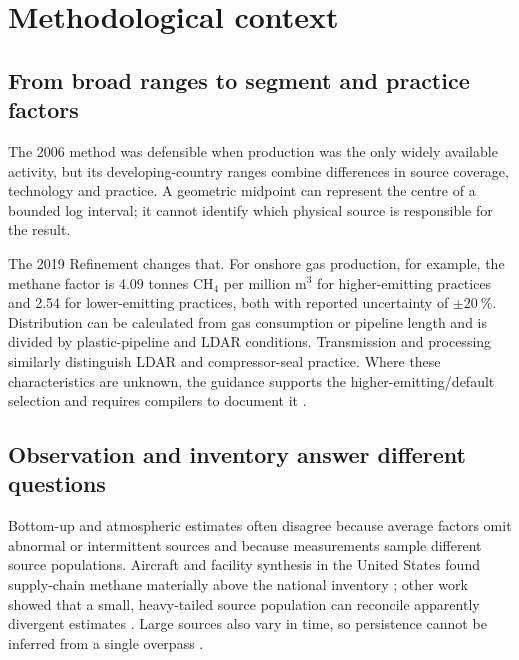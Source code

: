 \section{Methodological context}
\label{sec:related}

\subsection{From broad ranges to segment and practice factors}

The 2006 method was defensible when production was the only widely available activity, but its
developing-country ranges combine differences in source coverage, technology and practice. A
geometric midpoint can represent the centre of a bounded log interval; it cannot identify which
physical source is responsible for the result.

The 2019 Refinement changes that. For onshore gas production, for example, the methane factor is
\num{4.09} tonnes CH$_4$ per million m$^3$ for higher-emitting practices and
\SI{2.54}{} for lower-emitting practices, both with reported uncertainty of
$\pm\SI{20}{\percent}$. Distribution can be calculated from gas consumption or pipeline length
and is divided by plastic-pipeline and LDAR conditions. Transmission and processing similarly
distinguish LDAR and compressor-seal practice. Where these characteristics are unknown, the
guidance supports the higher-emitting/default selection and requires compilers to document it
\citep{ipcc2019}.

\subsection{Observation and inventory answer different questions}

Bottom-up and atmospheric estimates often disagree because average factors omit abnormal or
intermittent sources and because measurements sample different source populations. Aircraft and
facility synthesis in the United States found supply-chain methane materially above the national
inventory \citep{alvarez2018methane}; other work showed that a small, heavy-tailed source
population can reconcile apparently divergent estimates \citep{zavalaaraiza2015}. Large sources
also vary in time, so persistence cannot be inferred from a single overpass
\citep{cusworth2021intermittency}.

